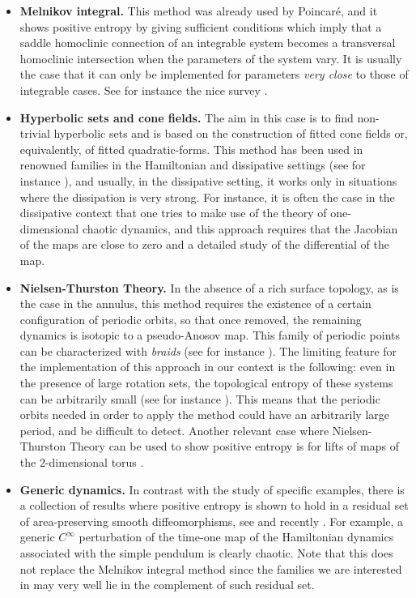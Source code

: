 \documentclass[12pt,a4paper]{amsart}
\theoremstyle{definition}
\theoremstyle{remark}
\begin{document}
\begin{itemize}
\item \textbf{Melnikov integral.} This method was already used by Poincar\'{e}, and it shows positive entropy by giving sufficient conditions which imply that a saddle homoclinic connection of an integrable
system becomes a transversal homoclinic intersection when the parameters of the system
vary. It is usually the case that it can only be implemented for parameters \emph{very close} to those of integrable cases. See for instance the nice survey \cite{holmesmeli}.


\item \textbf{Hyperbolic sets and cone fields.} The aim in this case is to find non-trivial hyperbolic sets and is based on the construction of fitted cone fields or, equivalently,
of fitted quadratic-forms. This method has been used in renowned families in the Hamiltonian and dissipative settings (see for instance \cite{bunimovich,laisangyoung}), and usually, in the dissipative setting, it works only in situations where the dissipation is very strong.  For instance, it is often the case in the dissipative context that one tries to make use of the theory of one-dimensional chaotic dynamics, and this approach requires that the Jacobian of the maps are close to zero and
 a detailed study of the differential of the map.

\item \textbf{Nielsen-Thurston Theory.} In the absence of a rich surface topology, as is the case in the annulus, this method requires the existence of a certain configuration of periodic orbits, so that once removed, the remaining dynamics is isotopic to a pseudo-Anosov map. This family of periodic points can be characterized with \emph{braids} (see for instance \cite{braids1,braids2}). The limiting feature for the implementation of this approach in our context is the following: even in the presence of large rotation sets, the topological entropy of these systems can be arbitrarily small (see for instance \cite{paposa}). This means that the periodic orbits needed in order to apply the method could have an arbitrarily large period, and be difficult to detect. 
Another relevant case where Nielsen-Thurston Theory can be used to show positive entropy is for lifts of maps of the $2$-dimensional torus \cite{libremckay}.

\item \textbf{Generic dynamics.} In contrast with the study of specific examples, there is a collection of results where positive entropy is shown to hold in a residual set of area-preserving smooth diffeomorphisms, see \cite{takens,pixton} and recently \cite{lepe}. For example, a generic $C^\infty$ perturbation of the time-one map of the Hamiltonian dynamics associated with the simple pendulum is clearly chaotic. Note that this does not replace the Melnikov integral method since the families we are interested in may very well lie in the complement of such residual set.


\end{itemize}
\end{document}
